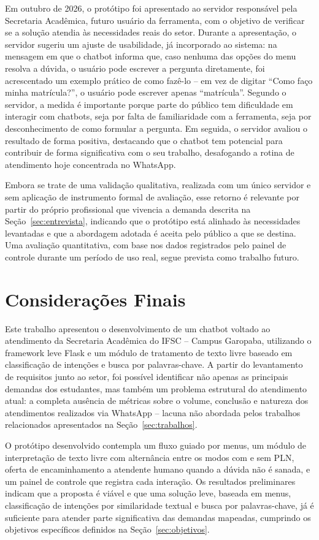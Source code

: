 \documentclass[12pt]{article}
\begin{document}
Em outubro de 2026, o protótipo foi apresentado ao servidor responsável
pela Secretaria Acadêmica, futuro usuário da ferramenta, com o objetivo
de verificar se a solução atendia às necessidades reais do setor. Durante
a apresentação, o servidor sugeriu um ajuste de usabilidade, já
incorporado ao sistema: na mensagem em que o chatbot informa que, caso
nenhuma das opções do menu resolva a dúvida, o usuário pode escrever a
pergunta diretamente, foi acrescentado um exemplo prático de como fazê-lo
-- em vez de digitar ``Como faço minha matrícula?'', o usuário pode
escrever apenas ``matrícula''. Segundo o servidor, a medida é importante
porque parte do público tem dificuldade em interagir com chatbots, seja
por falta de familiaridade com a ferramenta, seja por desconhecimento de
como formular a pergunta. Em seguida, o servidor avaliou o resultado de
forma positiva, destacando que o chatbot tem potencial para contribuir de
forma significativa com o seu trabalho, desafogando a rotina de
atendimento hoje concentrada no WhatsApp.

Embora se trate de uma validação qualitativa, realizada com um único
servidor e sem aplicação de instrumento formal de avaliação, esse retorno
é relevante por partir do próprio profissional que vivencia a demanda
descrita na Seção~\ref{sec:entrevista}, indicando que o protótipo está alinhado às
necessidades levantadas e que a abordagem adotada é aceita pelo público
a que se destina. Uma avaliação quantitativa, com base nos dados
registrados pelo painel de controle durante um período de uso real, segue
prevista como trabalho futuro.

\section{Considerações Finais}

Este trabalho apresentou o desenvolvimento de um chatbot voltado ao
atendimento da Secretaria Acadêmica do IFSC -- Campus Garopaba,
utilizando o framework leve Flask e um módulo de tratamento de texto livre baseado em classificação de intenções e busca por palavras-chave. A partir do levantamento de
requisitos junto ao setor, foi possível identificar não apenas as
principais demandas dos estudantes, mas também um problema estrutural do
atendimento atual: a completa ausência de métricas sobre o volume,
conclusão e natureza dos atendimentos realizados via WhatsApp -- lacuna
não abordada pelos trabalhos relacionados apresentados na Seção~\ref{sec:trabalhos}.

O protótipo desenvolvido contempla um fluxo guiado por menus, um módulo
de interpretação de texto livre com alternância entre os modos com e sem
PLN, oferta de encaminhamento a atendente humano quando a dúvida não é sanada, e um
painel de controle que registra cada interação. Os resultados
preliminares indicam que a proposta é viável e que uma solução leve,
baseada em menus, classificação de intenções por similaridade textual e busca por palavras-chave, já é suficiente para
atender parte significativa das demandas mapeadas, cumprindo os
objetivos específicos definidos na Seção~\ref{sec:objetivos}.
\end{document}
